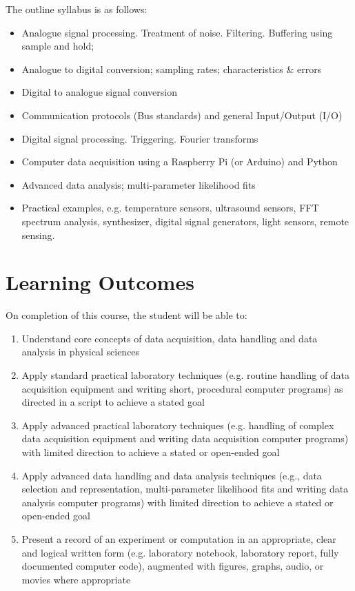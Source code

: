 The outline syllabus is as follows:
\begin{itemize}
\item Analogue signal processing. Treatment of noise. Filtering. Buffering using sample and hold;
\item Analogue to digital conversion; sampling rates; characteristics \& errors
\item Digital to analogue signal conversion
\item Communication protocols (Bus standards) and general Input/Output (I/O)
\item Digital signal processing. Triggering. Fourier transforms
\item Computer data acquisition using a Raspberry Pi (or Arduino) and Python
\item Advanced data analysis; multi-parameter likelihood fits
\item Practical examples, e.g. temperature sensors, ultrasound sensors, FFT spectrum analysis, synthesizer, digital signal generators, light sensors, remote sensing.%
\end{itemize}

\section{Learning Outcomes}

On completion of this course, the student will be able to:
\begin{enumerate}
\item Understand core concepts of data acquisition, data handling and data analysis in physical sciences
\item Apply standard practical laboratory techniques (e.g. routine handling of data acquisition equipment and writing short, procedural computer programs) as directed in a script to achieve a stated goal
\item Apply advanced practical laboratory techniques (e.g. handling of complex data acquisition equipment and writing data acquisition computer programs) with limited direction to achieve a stated or open-ended goal
\item Apply advanced data handling and data analysis techniques (e.g., data selection and representation, multi-parameter likelihood fits and writing data analysis computer programs) with limited direction to achieve a stated or open-ended goal
\item Present a record of an experiment or computation in an appropriate, clear and logical written form (e.g. laboratory notebook, laboratory report, fully documented computer code), augmented with figures, graphs, audio, or movies where appropriate
\end{enumerate}


